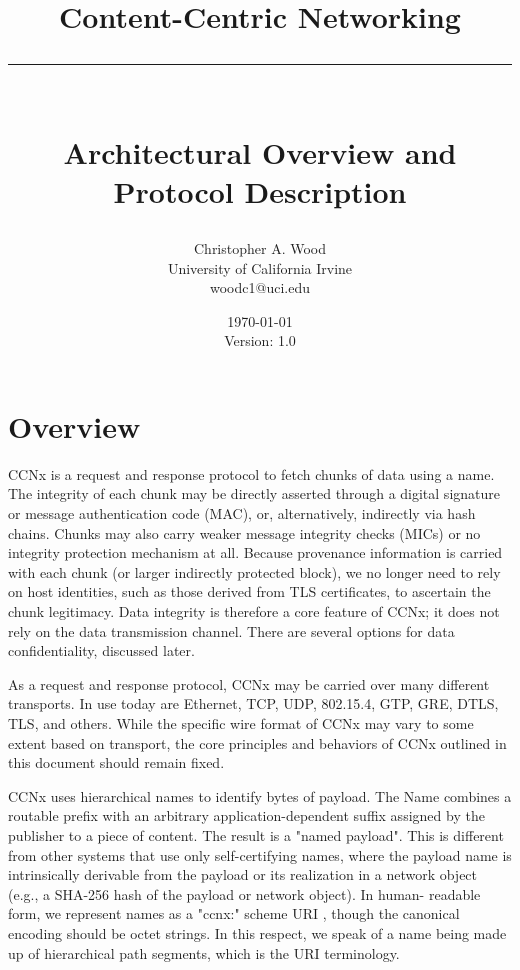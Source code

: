 \documentclass[12pt]{article}
\newcommand{\HRule}[1]{\rule{\linewidth}{#1}}
\begin{document}
\title{ \LARGE \textbf{Content-Centric Networking}
        \HRule{2pt} \\ [0.5cm]
        \large Architectural Overview and Protocol Description}

\date{\today \\ Version: 1.0}

\author{
        Christopher A. Wood \\
        University of California Irvine \\
        woodc1@uci.edu }

\maketitle
\tableofcontents
\newpage


\section{Overview}
CCNx is a request and response protocol to fetch chunks of data using
a name.  The integrity of each chunk may be directly asserted through
a digital signature or message authentication code (MAC), or,
alternatively, indirectly via hash chains.  Chunks may also carry
weaker message integrity checks (MICs) or no integrity protection
mechanism at all.  Because provenance information is carried with
each chunk (or larger indirectly protected block), we no longer need
to rely on host identities, such as those derived from TLS
certificates, to ascertain the chunk legitimacy.  Data integrity is
therefore a core feature of CCNx; it does not rely on the data
transmission channel.  There are several options for data
confidentiality, discussed later.

As a request and response protocol, CCNx may be carried over many
different transports.  In use today are Ethernet, TCP, UDP, 802.15.4,
GTP, GRE, DTLS, TLS, and others.  While the specific wire format of
CCNx may vary to some extent based on transport, the core principles
and behaviors of CCNx outlined in this document should remain fixed.

CCNx uses hierarchical names to identify bytes of payload.  The Name
combines a routable prefix with an arbitrary application-dependent
suffix assigned by the publisher to a piece of content.  The result
is a "named payload".  This is different from other systems that use
only self-certifying names, where the payload name is intrinsically
derivable from the payload or its realization in a network object
(e.g., a SHA-256 hash of the payload or network object).  In human-
readable form, we represent names as a "ccnx:" scheme URI
\cite{berners2014rfc}, though the canonical encoding should be octet strings.  In
this respect, we speak of a name being made up of hierarchical path
segments, which is the URI terminology.
\end{document}
